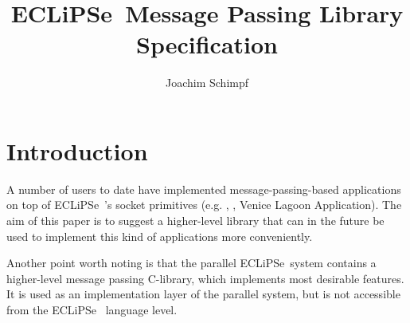 %
% 
% 
% 
% 

\def\eclipse{ECLiPSe\ }
\def\eclipsetwo{ECLiPSe\ II\ }
\def\cplex{CPLEX\ }
\def\lp{linear programming\ }

\title{\eclipse Message Passing Library Specification}
\author{Joachim Schimpf}


\maketitle

\section{Introduction}

A number of users to date have implemented message-passing-based
applications on top of \eclipse's socket primitives (e.g.
\cite{pitt}, \cite{vass}, Venice Lagoon Application). 
The aim of this paper is to suggest a higher-level library
that can in the future be used to implement this kind of applications
more conveniently.

Another point worth noting is that the parallel \eclipse system
contains a higher-level message passing C-library, which implements
most desirable features. It is used as an implementation layer of
the parallel system, but is not accessible from the \eclipse
language level.

